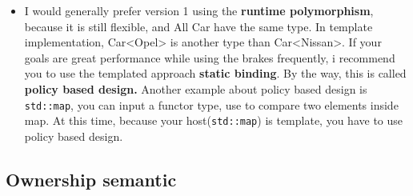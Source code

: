 \documentclass[a4paper,11pt,twoside]{book}
\begin{document}
\begin{itemize}
	\item I would generally prefer version 1 using the \textbf{runtime polymorphism}, because it is still flexible, and All Car  have the same type. In template implementation,  Car<Opel> is another type than Car<Nissan>. If your goals are great performance while using the brakes frequently, i recommend you to use the templated approach \textbf{static binding}. By the way, this is called \textbf{policy based design.} Another example about policy based design is \texttt{std::map}, you can input a functor type, use to compare two elements inside map. At this time, because your host(\texttt{std::map}) is template, you have to use policy based design.
\end{itemize}


\subsection{Ownership semantic}
\end{document}

